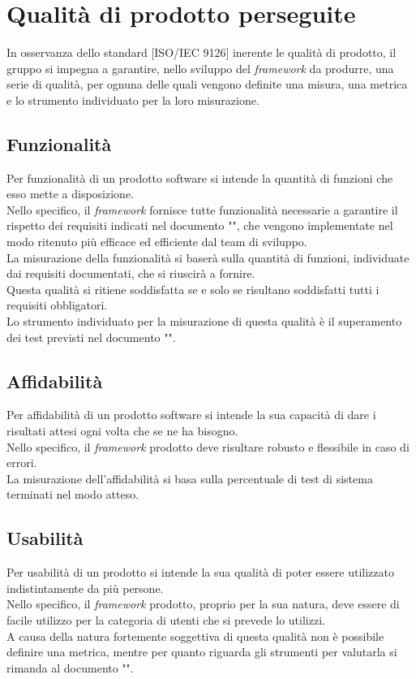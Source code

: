
\section{Qualità di prodotto perseguite}
	In osservanza dello standard [ISO/IEC 9126] inerente le qualità di prodotto, il gruppo \groupname si impegna a garantire, nello sviluppo del \textit{framework} da produrre, una serie di qualità, per ognuna delle quali vengono definite una misura, una metrica e lo strumento individuato per la loro misurazione.
	\subsection{Funzionalità}
		Per funzionalità di un prodotto software si intende la quantità di funzioni che esso mette a disposizione.\\
		Nello specifico, il \textit{framework} fornisce tutte funzionalità necessarie a garantire il rispetto dei requisiti indicati nel documento "", che vengono implementate nel modo ritenuto più efficace ed efficiente dal team di sviluppo.\\
		La misurazione della funzionalità si baserà sulla quantità di funzioni, individuate dai requisiti documentati, che si riuscirà a fornire.\\
		Questa qualità si ritiene soddisfatta se e solo se risultano soddisfatti tutti i requisiti obbligatori.\\
		Lo strumento individuato per la misurazione di questa qualità è il superamento dei test previsti nel documento "".
	\subsection{Affidabilità}
		Per affidabilità di un prodotto software si intende la sua capacità di dare i risultati attesi ogni volta che se ne ha bisogno.\\
		Nello specifico, il \textit{framework} prodotto deve risultare robusto e flessibile in caso di errori.\\
		La misurazione dell'affidabilità si basa sulla percentuale di test di sistema terminati nel modo atteso.
	\subsection{Usabilità}
		Per usabilità di un prodotto si intende la sua qualità di poter essere utilizzato indistintamente da più persone.\\
		Nello specifico, il \textit{framework} prodotto, proprio per la sua natura, deve essere di facile utilizzo per la categoria di utenti che si prevede lo utilizzi.\\
		A causa della natura fortemente soggettiva di questa qualità non è possibile definire una metrica, mentre per quanto riguarda gli strumenti per valutarla si rimanda al documento "".
